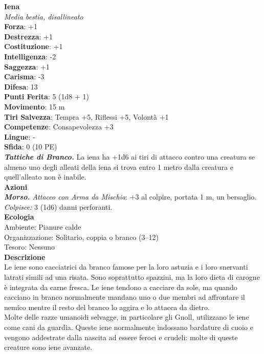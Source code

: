 \begin{multicols}{2}
\medskip\textbf{Iena}\\
\emph{Media bestia, disallineato}\\
\textbf{Forza}: +1\\
\textbf{Destrezza}: +1\\
\textbf{Costituzione}: +1\\
\textbf{Intelligenza}: -2\\
\textbf{Saggezza}: +1\\
\textbf{Carisma}: -3\\
\textbf{Difesa}: 13\\
\textbf{Punti Ferita}: 5 (1d8 + 1)\\
\textbf{Movimento}: 15 m\\
\textbf{Tiri Salvezza}: Tempra +5, Riflessi +5, Volontà +1 \\
\textbf{Competenze}: Consapevolezza +3\\
\textbf{Lingue}: -\\
\textbf{Sfida}: 0 (10 PE)\smallskip\\
\emph{\textbf{Tattiche di Branco.}} La iena ha +1d6 ai tiri di attacco contro una creatura se almeno uno degli alleati della iena si trova entro 1 metro dalla creatura e quell'alleato non è inabile.\\
\smallskip\textbf{Azioni}\\
\emph{\textbf{Morso.} Attacco con Arma da Mischia}: +3 al colpire, portata 1 m, un bersaglio.\\
\emph{Colpisce:} 3 (1d6) danni perforanti.\\
\textbf{Ecologia}\\
Ambiente: Pianure calde\\
Organizzazione: Solitario, coppia o branco (3–12)\\
Tesoro: Nessuno\\
\textbf{Descrizione}\\

Le iene sono cacciatrici da branco famose per la loro astuzia e i loro snervanti latrati simili ad una risata. Sono soprattutto spazzini, ma la loro dieta di carogne è integrata da carne fresca. Le iene tendono a cacciare da sole, ma quando cacciano in branco normalmente mandano uno o due membri ad affrontare il nemico mentre il resto del branco lo aggira e lo attacca da dietro.\\

Molte delle razze umanoidi selvagge, in particolare gli Gnoll, utilizzano le iene come cani da guardia. Queste iene normalmente indossano bardature di cuoio e vengono addestrate dalla nascita ad essere feroci e crudeli: molte di queste creature sono iene avanzate. \\



\end{multicols}
